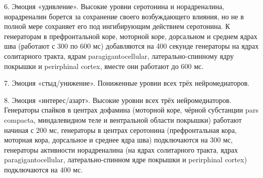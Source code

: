 6. Эмоция «удивление». Высокие уровни серотонина и норадреналина, норадреналин борется за сохранение своего возбуждающего влияния, но не в полной мере сохраняет его под ингибирующим действием серотонина. К генераторам в префронтальной коре, моторной коре, дорсальном и среднем ядрах шва (работают с 300 по 600 мс) добавляются на 400 секунде генераторы на ядрах солитарного тракта, ядрам paragigantocellular, латерально-спинному ядру покрышки и perirphinal cortex, вместе они работают до 600 мс.

7. Эмоция «стыд/унижение». Пониженные уровни всех трёх нейромедиаторов.

8. Эмоция «интерес/азарт». Высокие уровни всех трёх нейромедиаторов. Генераторы спайков в центрах дофамина (моторной коре, чёрной субстанции pars compacta, миндалевидном теле и вентральной области покрышки) работают начиная с 200 мс, генераторы в центрах серотонина (префронтальная кора, моторная кора, дорсальное и среднее ядра шва) подключаются на 300 мс, генераторы активности норадреналина (на ядрах солитарного тракта, ядрах paragigantocellular, латерально-спинном ядре покрышки и perirphinal cortex) подключаются на 400 мс.